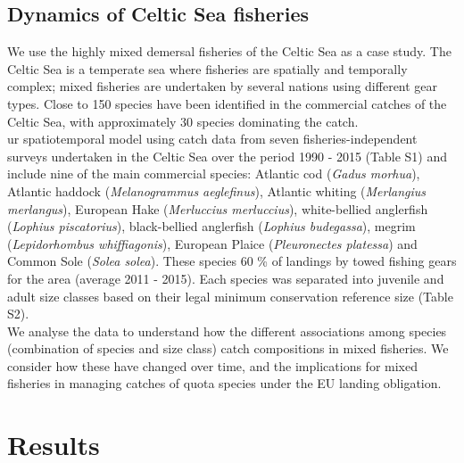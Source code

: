 \documentclass[fleqn,10pt]{wlscirep}
\begin{document}
\begin{linenumbers}
\subsection*{Dynamics of Celtic Sea fisheries\\}

We use the highly mixed demersal fisheries of the Celtic Sea as a case study.
The Celtic Sea is a temperate sea where fisheries are spatially and temporally
complex; mixed fisheries are undertaken by several nations using different gear
types\cite{Ellis2000, Gerritsen2012}. Close to 150 species have been
identified in the commercial catches of the Celtic Sea, with approximately 30
species dominating the catch\cite{Mateo2016}.\\

ur spatiotemporal model  using catch data from seven
fisheries-independent surveys undertaken in the Celtic Sea over the period 1990
- 2015 (Table S1) and include nine of the main commercial species: Atlantic cod
(\textit{Gadus morhua}), Atlantic haddock (\textit{Melanogrammus aeglefinus}),
Atlantic whiting (\textit{Merlangius merlangus}), European Hake
(\textit{Merluccius merluccius}), white-bellied anglerfish (\textit{Lophius
	piscatorius}), black-bellied anglerfish (\textit{Lophius budegassa}),
megrim (\textit{Lepidorhombus whiffiagonis}), European Plaice
(\textit{Pleuronectes platessa}) and Common Sole (\textit{Solea solea}). These
species  60 \% of landings by towed fishing gears for the
area (average 2011 - 2015\cite{STECF2017}). Each species was separated into
juvenile and adult size classes based on their legal minimum conservation
reference size (Table S2).\\

We analyse the data to understand how the different associations among species
(combination of species and size class)  catch
compositions  in mixed fisheries. We
consider how these have changed over time, and the implications for mixed
fisheries in managing catches of quota species under the EU landing
obligation.\\

\section*{Results\\}


\end{linenumbers}
\end{document}
